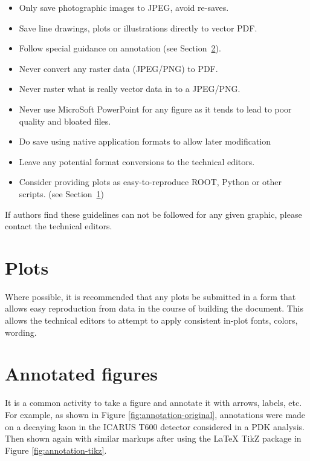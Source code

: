 \begin{itemize}
\item Only save photographic images to JPEG, avoid re-saves.
\item Save line drawings, plots or illustrations directly to vector PDF.
\item Follow special guidance on annotation (see Section~\ref{sec:graphic-annotate}).
\item Never convert any raster data (JPEG/PNG) to PDF.
\item Never raster what is really vector data in to a JPEG/PNG.
\item Never use MicroSoft PowerPoint for any figure as it tends to lead to poor quality and bloated files.
\item Do save using native application formats to allow later
  modification
\item Leave any potential format conversions to the technical editors.
\item Consider providing plots as easy-to-reproduce ROOT, Python or
  other scripts.
  (see Section~\ref{sec:graphic-plots})
\end{itemize}

\noindent If authors find these guidelines can not be followed for any
given graphic, please contact the technical editors.   

\section{Plots}
\label{sec:graphic-plots}

Where possible, it is recommended that any plots be submitted in a
form that allows easy reproduction from data in the course of building
the document.
This allows the technical editors to attempt to apply consistent
in-plot fonts, colors, wording.

\section{Annotated figures}
\label{sec:graphic-annotate}

It is a common activity to take a figure and annotate it with arrows, labels, etc.
For example, as shown in Figure \ref{fig:annotation-original}, annotations were made on a decaying kaon in the ICARUS T600 detector
considered in a PDK analysis. Then shown again with similar markups after using the \LaTeX{} TikZ package in Figure \ref{fig:annotation-tikz}.

